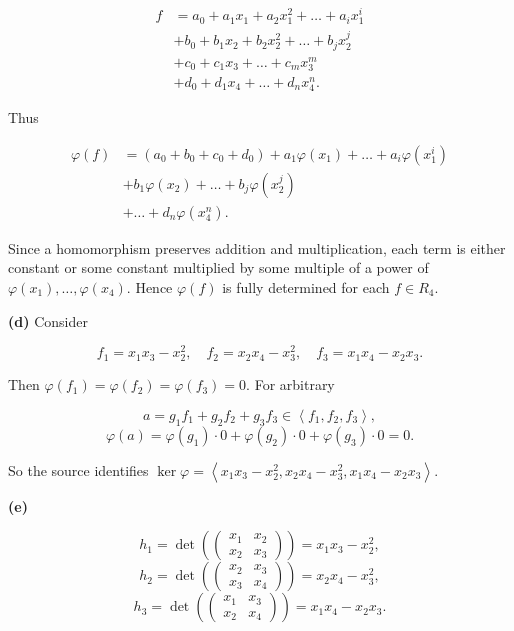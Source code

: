 \[\begin{matrix}
f & {= a_{0} + a_{1}x_{1} + a_{2}x_{1}^{2} + \ldots + a_{i}x_{1}^{i}} \\
 & {+ b_{0} + b_{1}x_{2} + b_{2}x_{2}^{2} + \ldots + b_{j}x_{2}^{j}} \\
 & {+ c_{0} + c_{1}x_{3} + \ldots + c_{m}x_{3}^{m}} \\
 & {+ d_{0} + d_{1}x_{4} + \ldots + d_{n}x_{4}^{n}.}
\end{matrix}\]

Thus

\[\begin{matrix}
{\varphi(f)} & {= \left( {a_{0} + b_{0} + c_{0} + d_{0}} \right) + a_{1}\varphi\left( x_{1} \right) + \ldots + a_{i}\varphi\left( x_{1}^{i} \right)} \\
 & {+ b_{1}\varphi\left( x_{2} \right) + \ldots + b_{j}\varphi\left( x_{2}^{j} \right)} \\
 & {+ \ldots + d_{n}\varphi\left( x_{4}^{n} \right).}
\end{matrix}\]

Since a homomorphism preserves addition and multiplication, each term is either constant or some constant multiplied by some multiple of a power of \(\varphi\left( x_{1} \right),\ldots,\varphi\left( x_{4} \right)\). Hence \(\varphi(f)\) is fully determined for each \(f \in R_{4}\).

\textbf{(d)} Consider

\[f_{1} = x_{1}x_{3} - x_{2}^{2},\quad f_{2} = x_{2}x_{4} - x_{3}^{2},\quad f_{3} = x_{1}x_{4} - x_{2}x_{3}.\]

Then \(\varphi\left( f_{1} \right) = \varphi\left( f_{2} \right) = \varphi\left( f_{3} \right) = 0\). For arbitrary

\[a = g_{1}f_{1} + g_{2}f_{2} + g_{3}f_{3} \in \left\langle {f_{1},f_{2},f_{3}} \right\rangle,\]\[\varphi(a) = \varphi\left( g_{1} \right) \cdot 0 + \varphi\left( g_{2} \right) \cdot 0 + \varphi\left( g_{3} \right) \cdot 0 = 0.\]

So the source identifies \(\ker\varphi = \left\langle {x_{1}x_{3} - x_{2}^{2},x_{2}x_{4} - x_{3}^{2},x_{1}x_{4} - x_{2}x_{3}} \right\rangle\).

\textbf{(e)}

\[h_{1} = \det\left( \begin{pmatrix}
x_{1} & x_{2} \\
x_{2} & x_{3}
\end{pmatrix} \right) = x_{1}x_{3} - x_{2}^{2},\]\[h_{2} = \det\left( \begin{pmatrix}
x_{2} & x_{3} \\
x_{3} & x_{4}
\end{pmatrix} \right) = x_{2}x_{4} - x_{3}^{2},\]\[h_{3} = \det\left( \begin{pmatrix}
x_{1} & x_{3} \\
x_{2} & x_{4}
\end{pmatrix} \right) = x_{1}x_{4} - x_{2}x_{3}.\]

